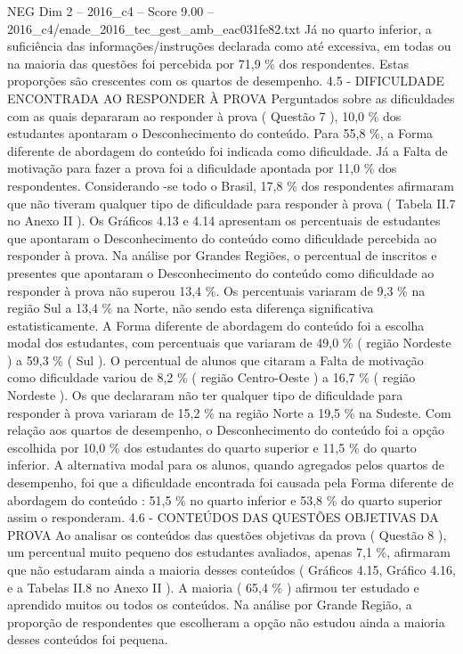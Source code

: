 \begin{textsample}{NEG Dim 2 – 2016\_c4 – Score 9.00 – 2016\_c4/enade\_2016\_tec\_gest\_amb\_eac031fe82.txt}
Já no quarto inferior, a suficiência das informações/instruções declarada como até excessiva, em todas ou na maioria das questões foi percebida por 71,9 \% dos respondentes.
Estas proporções são crescentes com os quartos de desempenho. 4.5 - DIFICULDADE ENCONTRADA AO RESPONDER À PROVA Perguntados sobre as dificuldades com as quais depararam ao responder à prova ( Questão 7 ), 10,0 \% dos estudantes apontaram o Desconhecimento do conteúdo.
Para 55,8 \%, a Forma diferente de abordagem do conteúdo foi indicada como dificuldade.
Já a Falta de motivação para fazer a prova foi a dificuldade apontada por 11,0 \% dos respondentes.
Considerando -se todo o Brasil, 17,8 \% dos respondentes afirmaram que não tiveram qualquer tipo de dificuldade para responder à prova ( Tabela II.7 no Anexo II ).
Os Gráficos 4.13 e 4.14 apresentam os percentuais de estudantes que apontaram o Desconhecimento do conteúdo como dificuldade percebida ao responder à prova.
Na análise por Grandes Regiões, o percentual de inscritos e presentes que apontaram o Desconhecimento do conteúdo como dificuldade ao responder à prova não superou 13,4 \%.
Os percentuais variaram de 9,3 \% na região Sul a 13,4 \% na Norte, não sendo esta diferença significativa estatisticamente.
A Forma diferente de abordagem do conteúdo foi a escolha modal dos estudantes, com percentuais que variaram de 49,0 \% ( região Nordeste ) a 59,3 \% ( Sul ).
O percentual de alunos que citaram a Falta de motivação como dificuldade variou de 8,2 \% ( região Centro-Oeste ) a 16,7 \% ( região Nordeste ).
Os que declararam não ter qualquer tipo de dificuldade para responder à prova variaram de 15,2 \% na região Norte a 19,5 \% na Sudeste.
Com relação aos quartos de desempenho, o Desconhecimento do conteúdo foi a opção escolhida por 10,0 \% dos estudantes do quarto superior e 11,5 \% do quarto inferior.
A alternativa modal para os alunos, quando agregados pelos quartos de desempenho, foi que a dificuldade encontrada foi causada pela Forma diferente de abordagem do conteúdo : 51,5 \% no quarto inferior e 53,8 \% do quarto superior assim o responderam. 4.6 - CONTEÚDOS DAS QUESTÕES OBJETIVAS DA PROVA Ao analisar os conteúdos das questões objetivas da prova ( Questão 8 ), um percentual muito pequeno dos estudantes avaliados, apenas 7,1 \%, afirmaram que não estudaram ainda a maioria desses conteúdos ( Gráficos 4.15, Gráfico 4.16, e a Tabelas II.8 no Anexo II ).
A maioria ( 65,4 \% ) afirmou ter estudado e aprendido muitos ou todos os conteúdos.
Na análise por Grande Região, a proporção de respondentes que escolheram a opção não estudou ainda a maioria desses conteúdos foi pequena.

\end{textsample}
